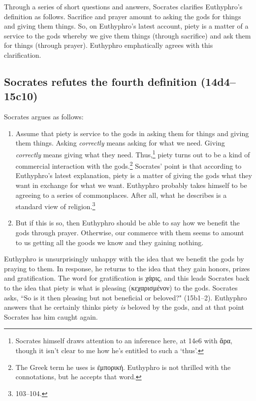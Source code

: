\documentclass[11pt]{article}
\begin{document}
Through a series of short questions and answers, Socrates clarifies
Euthyphro's definition as follows.  Sacrifice and prayer amount to asking
the gods for things and giving them things.  So, on Euthyphro's latest
account, piety is a matter of a service to the gods whereby we give them
things (through sacrifice) and ask them for things (through prayer).
Euthyphro emphatically agrees with this clarification.

\subsection{Socrates refutes the fourth definition (14d4--15c10)}

Socrates argues as follows:

\begin{enumerate}
    \item Assume that piety is service to the gods in asking them for
        things and giving them things.  Asking \emph{correctly} means
        asking for what we need.  Giving \emph{correctly} means giving what
        they need.  Thus,\footnote{Socrates himself draws attention to an
        inference here, at 14e6 with ἄρα, though it isn't clear to me how
        he's entitled to such a `thus'.} piety turns out to be a kind of
        commercial interaction with the gods.\footnote{The Greek term he
        uses is ἐμπορική.  Euthyphro is not thrilled with the connotations,
        but he accepts that word.}  Socrates' point is that according to
        Euthyphro's latest explanation, piety is a matter of giving the
        gods what they want in exchange for what we want.  Euthyphro
        probably takes himself to be agreeing to a series of commonplaces.
        After all, what he describes is a standard  view
        of religion.\footnote{\citet{bailly2003} 103--104.}
    \item But if this is so, then Euthyphro should be able to say how we
        benefit the gods through prayer.  Otherwise, our commerce with them
        seems to amount to us getting all the goods we know and they
        gaining nothing.
\end{enumerate}

Euthyphro is unsurprisingly unhappy with the idea that we benefit the gods
by praying to them. In response, he returns to the idea that they gain
honors, prizes and gratification.  The word for gratification is χάρις, and
this leads Socrates back to the idea that piety is what is pleasing
(κεχαρισμένον) to the gods.  Socrates asks, ``So is it then pleasing but
not beneficial or beloved?" (15b1--2).  Euthyphro answers that he certainly
thinks piety \emph{is} beloved by the gods, and at that point Socrates has
him caught again.
\end{document}
